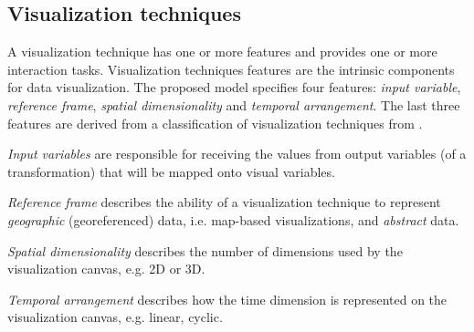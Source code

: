 \documentclass[]{interact}
\theoremstyle{plain}%
\theoremstyle{definition}
\theoremstyle{remark}
\theoremstyle{definition}
\begin{document}
%

%



\subsection{Visualization techniques}
\label{sec:vis}

A visualization technique has one or more features and provides one or more interaction tasks. Visualization techniques features are the intrinsic components for data visualization. The proposed model specifies four features: \emph{input variable}, \emph{reference frame}, \emph{spatial dimensionality} and \emph{temporal arrangement}. The last three features are derived from a classification of visualization techniques from \cite{Aigner2011}.

\emph{Input variables} are responsible for receiving the values from output variables (of a transformation) that will be mapped onto visual variables.

\emph{Reference frame} describes the ability of a visualization technique to represent \emph{geographic} (georeferenced) data, i.e. map-based visualizations, and \emph{abstract} data.

\emph{Spatial dimensionality} describes the number of dimensions used by the visualization canvas, e.g. 2D or 3D.

\emph{Temporal arrangement} describes how the time dimension is represented on the visualization canvas, e.g. linear, cyclic.
\end{document}
